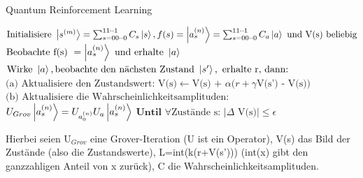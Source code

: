 \begin{algorithm}
\caption{Quantum Reinforcement Learning \cite{QuantumReinfDong}}
\begin{algorithmic}[1]
\State $\text{Initialisiere }\ket{s^{(m)}} = \sum_{s=00\cdot\cdot0}^{11\cdot\cdot1} C_s \ket{s}, f(s) = \ket{a_s^{(n)}} = \sum_{s=00\cdot\cdot0}^{11\cdot\cdot1} C_a \ket{a} \text{ und V(s) beliebig}$
\State $\text{Beobachte f(s) } = \ket{a_s^{(n)}} \text{ und erhalte }\ket{a}$
\State $\text{Wirke }\ket{a},\text{beobachte den nächsten Zustand }\ket{s'},\text{ erhalte r, dann:}$
\State $\text{(a) Aktualisiere den Zustandswert: V(s)}\leftarrow \text{V(s) + }\alpha(r + \gamma\text{V(s') - V(s))}$
\State $\text{(b) Aktualisiere die Wahrscheinlichkeitsamplituden:}$
\Repeat
\State $U_{Grov} \ket{a_s^{(n)}} = U_{a_0^{(n)}}U_a\ket{a_s^{(n)}}$
\EndFor
\State $\textbf{Until } \forall \text{Zustände s: } |\Delta\text{ V(s)}|\le \epsilon$
\EndProcedure
\end{algorithmic}
\end{algorithm}
Hierbei seien $\text{U}_{Grov}$ eine Grover-Iteration (U ist ein Operator), V(s) das Bild der Zustände (also die Zustandswerte), L=int(k(r+V(s'))) (int(x) gibt den ganzzahligen Anteil von x zurück), C die Wahrscheinlichkeitsamplituden.

